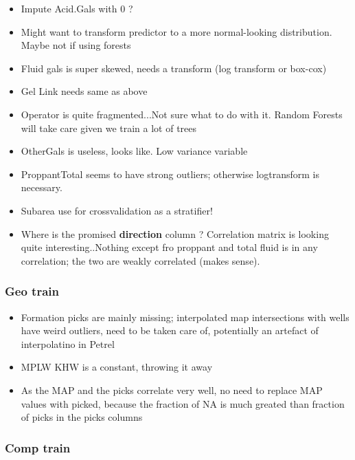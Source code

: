 \documentclass[11pt]{article}
\providecommand{\tightlist}{%
      \setlength{\itemsep}{0pt}\setlength{\parskip}{0pt}}
\begin{document}
\begin{itemize}
\tightlist
\item
  Impute Acid.Gals with 0 ?
\item
  Might want to transform predictor to a more normal-looking
  distribution. Maybe not if using forests
\item
  Fluid gals is super skewed, needs a transform (log transform or
  box-cox)
\item
  Gel Link needs same as above
\item
  Operator is quite fragmented...Not sure what to do with it. Random
  Forests will take care given we train a lot of trees
\item
  OtherGals is useless, looks like. Low variance variable
\item
  ProppantTotal seems to have strong outliers; otherwise logtransform is
  necessary.
\item
  Subarea use for crossvalidation as a stratifier!
\item
  Where is the promised \textbf{direction} column ? Correlation matrix
  is looking quite interesting..Nothing except fro proppant and total
  fluid is in any correlation; the two are weakly correlated (makes
  sense).
\end{itemize}

\subsubsection{Geo train}\label{geo-train}

\begin{itemize}
\tightlist
\item
  Formation picks are mainly missing; interpolated map intersections
  with wells have weird outliers, need to be taken care of, potentially
  an artefact of interpolatino in Petrel
\item
  MPLW KHW is a constant, throwing it away
\item
  As the MAP and the picks correlate very well, no need to replace MAP
  values with picked, because the fraction of NA is much greated than
  fraction of picks in the picks columns
\end{itemize}

\subsubsection{Comp train}\label{comp-train}
\end{document}
